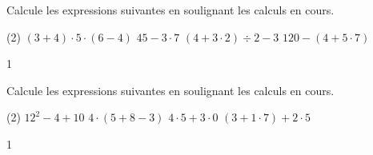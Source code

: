 \documentclass[a4paper,11pt]{report}
\begin{document}
\begin{exo}{
Calcule les expressions suivantes en soulignant les calculs en cours.
\begin{tasks}(2)
\task $(3+4)\cdot5\cdot(6-4)$
\task $45-3\cdot7$
\task $(4+3\cdot2)\div 2-3$
\task $120-(4+5\cdot7)$
\end{tasks}
}{1}\end{exo}

\begin{exo}{
Calcule les expressions suivantes en soulignant les calculs en cours.
\begin{tasks}(2)
\task $12^2-4+10$
\task $4\cdot(5+8-3)$
\task $4\cdot5 +3\cdot 0$
\task $(3+1\cdot 7) + 2\cdot 5$
\end{tasks}
}{1}\end{exo}


\end{document}

